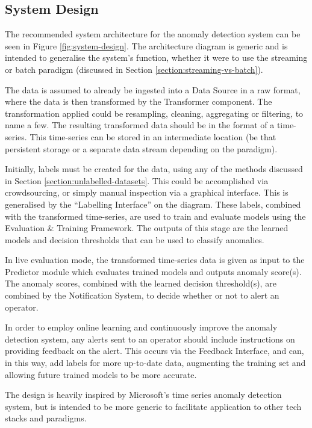 \documentclass{mpaper}
\begin{document}
\subsection{System Design}

The recommended system architecture for the anomaly detection system can be seen in Figure \ref{fig:system-design}. The architecture diagram is generic and is intended to generalise the system's function, whether it were to use the streaming or batch paradigm (discussed in Section \ref{section:streaming-vs-batch}).

The data is assumed to already be ingested into a Data Source in a raw format, where the data is then transformed by the Transformer component. The transformation applied could be resampling, cleaning, aggregating or filtering, to name a few. The resulting transformed data should be in the format of a time-series. This time-series can be stored in an intermediate location (be that persistent storage or a separate data stream depending on the paradigm).

Initially, labels must be created for the data, using any of the methods discussed in Section \ref{section:unlabelled-datasets}. This could be accomplished via crowdsourcing, or simply manual inspection via a graphical interface. This is generalised by the ``Labelling Interface'' on the diagram. These labels, combined with the transformed time-series, are used to train and evaluate models using the Evaluation \& Training Framework. The outputs of this stage are the learned models and decision thresholds that can be used to classify anomalies.

In live evaluation mode, the transformed time-series data is given as input to the Predictor module which evaluates trained models and outputs anomaly score(s). The anomaly scores, combined with the learned decision threshold(s), are combined by the Notification System, to decide whether or not to alert an operator.

In order to employ online learning and continuously improve the anomaly detection system, any alerts sent to an operator should include instructions on providing feedback on the alert. This occurs via the Feedback Interface, and can, in this way, add labels for more up-to-date data, augmenting the training set and allowing future trained models to be more accurate.

The design is heavily inspired by Microsoft's \citep{MicrosoftTimeSeries} time series anomaly detection system, but is intended to be more generic to facilitate application to other tech stacks and paradigms.
\end{document}
